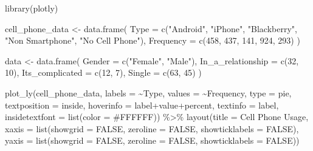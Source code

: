 \documentclass[
]{book}
\newenvironment{Shaded}{\begin{snugshade}}{\end{snugshade}}
\newcommand{\AttributeTok}[1]{\textcolor[rgb]{0.77,0.63,0.00}{#1}}
\newcommand{\ConstantTok}[1]{\textcolor[rgb]{0.00,0.00,0.00}{#1}}
\newcommand{\DecValTok}[1]{\textcolor[rgb]{0.00,0.00,0.81}{#1}}
\newcommand{\FunctionTok}[1]{\textcolor[rgb]{0.00,0.00,0.00}{#1}}
\newcommand{\NormalTok}[1]{#1}
\newcommand{\OtherTok}[1]{\textcolor[rgb]{0.56,0.35,0.01}{#1}}
\newcommand{\SpecialCharTok}[1]{\textcolor[rgb]{0.00,0.00,0.00}{#1}}
\newcommand{\StringTok}[1]{\textcolor[rgb]{0.31,0.60,0.02}{#1}}
\begin{document}
\begin{Shaded}
\begin{Highlighting}[]
\FunctionTok{library}\NormalTok{(plotly)}

\NormalTok{cell\_phone\_data }\OtherTok{\textless{}{-}} \FunctionTok{data.frame}\NormalTok{(}
  \AttributeTok{Type =} \FunctionTok{c}\NormalTok{(}\StringTok{"Android"}\NormalTok{, }\StringTok{"iPhone"}\NormalTok{, }\StringTok{"Blackberry"}\NormalTok{, }\StringTok{"Non Smartphone"}\NormalTok{, }\StringTok{"No Cell Phone"}\NormalTok{),}
  \AttributeTok{Frequency =} \FunctionTok{c}\NormalTok{(}\DecValTok{458}\NormalTok{, }\DecValTok{437}\NormalTok{, }\DecValTok{141}\NormalTok{, }\DecValTok{924}\NormalTok{, }\DecValTok{293}\NormalTok{)}
\NormalTok{)}

\NormalTok{data }\OtherTok{\textless{}{-}} \FunctionTok{data.frame}\NormalTok{(}
  \AttributeTok{Gender =} \FunctionTok{c}\NormalTok{(}\StringTok{"Female"}\NormalTok{, }\StringTok{"Male"}\NormalTok{),}
  \AttributeTok{In\_a\_relationship =} \FunctionTok{c}\NormalTok{(}\DecValTok{32}\NormalTok{, }\DecValTok{10}\NormalTok{),}
  \AttributeTok{Its\_complicated =} \FunctionTok{c}\NormalTok{(}\DecValTok{12}\NormalTok{, }\DecValTok{7}\NormalTok{),}
  \AttributeTok{Single =} \FunctionTok{c}\NormalTok{(}\DecValTok{63}\NormalTok{, }\DecValTok{45}\NormalTok{)}
\NormalTok{)}
\end{Highlighting}
\end{Shaded}

\begin{Shaded}
\begin{Highlighting}[]
\FunctionTok{plot\_ly}\NormalTok{(cell\_phone\_data, }\AttributeTok{labels =} \SpecialCharTok{\textasciitilde{}}\NormalTok{Type, }\AttributeTok{values =} \SpecialCharTok{\textasciitilde{}}\NormalTok{Frequency, }\AttributeTok{type =} \StringTok{\textquotesingle{}pie\textquotesingle{}}\NormalTok{,}
        \AttributeTok{textposition =} \StringTok{\textquotesingle{}inside\textquotesingle{}}\NormalTok{, }\AttributeTok{hoverinfo =} \StringTok{\textquotesingle{}label+value+percent\textquotesingle{}}\NormalTok{,}
        \AttributeTok{textinfo =} \StringTok{\textquotesingle{}label\textquotesingle{}}\NormalTok{, }\AttributeTok{insidetextfont =} \FunctionTok{list}\NormalTok{(}\AttributeTok{color =} \StringTok{\textquotesingle{}\#FFFFFF\textquotesingle{}}\NormalTok{)) }\SpecialCharTok{\%\textgreater{}\%}
  \FunctionTok{layout}\NormalTok{(}\AttributeTok{title =} \StringTok{\textquotesingle{}Cell Phone Usage\textquotesingle{}}\NormalTok{,}
         \AttributeTok{xaxis =} \FunctionTok{list}\NormalTok{(}\AttributeTok{showgrid =} \ConstantTok{FALSE}\NormalTok{, }\AttributeTok{zeroline =} \ConstantTok{FALSE}\NormalTok{, }\AttributeTok{showticklabels =} \ConstantTok{FALSE}\NormalTok{),}
         \AttributeTok{yaxis =} \FunctionTok{list}\NormalTok{(}\AttributeTok{showgrid =} \ConstantTok{FALSE}\NormalTok{, }\AttributeTok{zeroline =} \ConstantTok{FALSE}\NormalTok{, }\AttributeTok{showticklabels =} \ConstantTok{FALSE}\NormalTok{))}
\end{Highlighting}
\end{Shaded}
\end{document}

